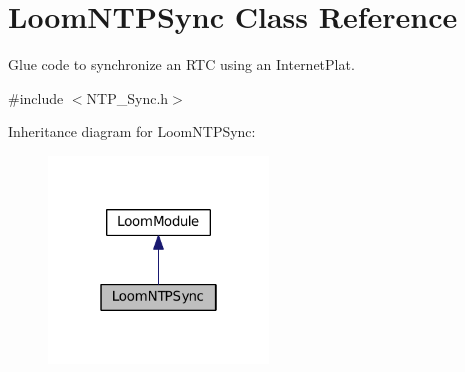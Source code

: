 \hypertarget{class_loom_n_t_p_sync}{}\section{Loom\+N\+T\+P\+Sync Class Reference}
\label{class_loom_n_t_p_sync}


Glue code to synchronize an R\+TC using an Internet\+Plat.  




{\ttfamily \#include $<$N\+T\+P\+\_\+\+Sync.\+h$>$}



Inheritance diagram for Loom\+N\+T\+P\+Sync\+:\nopagebreak
\begin{figure}[H]
\begin{center}
\leavevmode
\includegraphics[width=166pt]{class_loom_n_t_p_sync__inherit__graph}
\end{center}
\end{figure}
